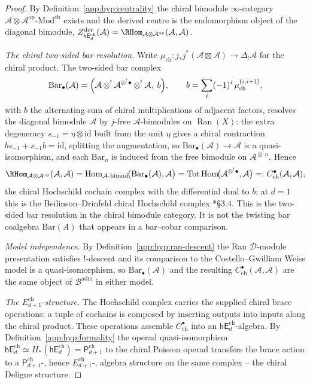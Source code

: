 \begin{proof}
By Definition~\ref{app:hyp:centrality} the chiral bimodule
\(\infty\)-category
\(\mathcal A\otimes\mathcal A^{\mathrm{op}}\text{-Mod}^{\mathrm{ch}}\)
exists and the derived centre is the endomorphism object of the
diagonal bimodule,
\(Z^{\mathrm{der}}_{\mathsf{hE}_d^{\mathrm{ch}}}(\mathcal A)
=\RHom_{\mathcal A\otimes\mathcal A^{\mathrm{op}}}(\mathcal A,\mathcal A)\).

\emph{The chiral two-sided bar resolution.}  Write
\(\mu_{\mathrm{ch}}\colon j_*j^*(\mathcal A\boxtimes\mathcal A)\to
\Delta_!\mathcal A\) for the chiral product.  The two-sided bar complex
\[
  \mathrm{Bar}_\bullet(\mathcal A)
  =\Bigl(\mathcal A\otimes^!\mathcal A^{\otimes^!\bullet}
    \otimes^!\mathcal A,\;b\Bigr),
  \qquad
  b=\sum_i(-1)^i\,\mu_{\mathrm{ch}}^{(i,i+1)},
\]
with \(b\) the alternating sum of chiral multiplications of adjacent
factors, resolves the diagonal bimodule \(\mathcal A\) by \(j\)-free
\(\mathcal A\)-bimodules on \(\operatorname{Ran}(X)\): the extra
degeneracy \(s_{-1}=\eta\otimes\mathrm{id}\) built from the unit
\(\eta\) gives a chiral contraction \(bs_{-1}+s_{-1}b=\mathrm{id}\),
splitting the augmentation, so
\(\mathrm{Bar}_\bullet(\mathcal A)\to\mathcal A\) is a
quasi-isomorphism, and each \(\mathrm{Bar}_n\) is induced from the free
bimodule on \(\mathcal A^{\otimes^! n}\).  Hence
\[
  \RHom_{\mathcal A\otimes\mathcal A^{\mathrm{op}}}(\mathcal A,\mathcal A)
  =\operatorname{Hom}_{\mathcal A\text{-bimod}}\!\bigl(
   \mathrm{Bar}_\bullet(\mathcal A),\mathcal A\bigr)
  =\operatorname{Tot}\operatorname{Hom}\!\bigl(
   \mathcal A^{\otimes^!\bullet},\mathcal A\bigr)
  =:C^\bullet_{\mathrm{ch}}(\mathcal A,\mathcal A),
\]
the chiral Hochschild cochain complex with the differential dual to
\(b\); at \(d=1\) this is the Beilinson--Drinfeld chiral Hochschild
complex \cite{beilinson-drinfeld-chiral}*{\S 3.4}.
This is the two-sided bar resolution in the chiral bimodule category.  It
is not the twisting bar coalgebra \(\mathrm{Bar}(A)\) that appears in a
bar--cobar comparison.

\emph{Model independence.}  By Definition~\ref{app:hyp:ran-descent} the
Ran \(\mathcal D\)-module presentation satisfies \(!\)-descent and its
comparison to the Costello--Gwilliam Weiss model is a
quasi-isomorphism, so \(\mathrm{Bar}_\bullet(\mathcal A)\) and the
resulting \(C^\bullet_{\mathrm{ch}}(\mathcal A,\mathcal A)\) are the same
object of \(\mathcal B^{\mathrm{adm}}\) in either model.

\emph{The \(E_{d+1}^{\mathrm{ch}}\)-structure.}  The Hochschild complex
carries the supplied chiral brace operations: a tuple of cochains is
composed by inserting outputs into inputs along the chiral product.
These operations assemble
\(C^\bullet_{\mathrm{ch}}\) into an
\(\mathsf{hE}_d^{\mathrm{ch}}\)-algebra.  By
Definition~\ref{app:hyp:formality} the operad quasi-isomorphism
\(\mathsf{hE}_d^{\mathrm{ch}}\simeq
H_*(\mathsf{hE}_d^{\mathrm{ch}})=\mathsf P_{d+1}^{\mathrm{ch}}\) to the
chiral Poisson operad transfers the brace action to a
\(\mathsf P_{d+1}^{\mathrm{ch}}\)-, hence
\(E_{d+1}^{\mathrm{ch}}\)-, algebra structure on the same complex --
the chiral Deligne structure.


\end{proof}
